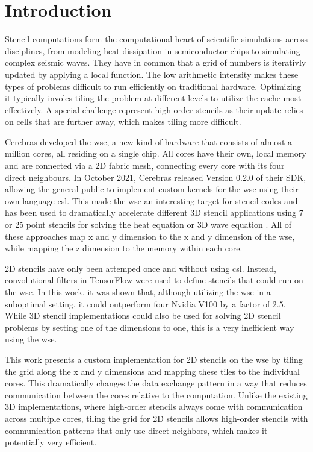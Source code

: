 \chapter{Introduction}
Stencil computations form the computational heart of scientific simulations across disciplines, from modeling heat dissipation in semiconductor chips to simulating complex seismic waves.
They have in common that a grid of numbers is iterativly updated by applying a local function.
The low arithmetic intensity makes these types of problems difficult to run efficiently on traditional hardware.
Optimizing it typically involes tiling the problem at different levels to utilize the cache most effectively.
A special challenge represent high-order stencils as their update relies on cells that are further away, which makes tiling more difficult.

Cerebras developed the \ac{wse}, a new kind of hardware that consists of almost a million cores, all residing on a single chip.
All cores have their own, local memory and are connected via a 2D fabric mesh, connecting every core with its four direct neighbours.
In October 2021, Cerebras released Version 0.2.0 of their SDK, allowing the general public to implement custom kernels for the \ac{wse} using their own language \ac{csl}. 
This made the \ac{wse} an interesting target for stencil codes and has been used to dramatically accelerate different 3D stencil applications using 7 or 25 point stencils for solving the heat equation or 3D wave equation \cite{jacquelin2022massively,rocki2020fast,woo2022disruptive}.
All of these approaches map x and y dimension to the x and y dimension of the \ac{wse}, while mapping the z dimension to the memory within each core.

2D stencils have only been attemped once and without using \ac{csl}. Instead, convolutional filters in TensorFlow were used to define stencils that could run on the \ac{wse}\cite{brown2022tensorflow}. In this work, it was shown that, although utilizing the \ac{wse} in a suboptimal setting, it could outperform four Nvidia V100 by a factor of 2.5. While 3D stencil implementations could also be used for solving 2D stencil problems by setting one of the dimensions to one, this is a very inefficient way using the \ac{wse}.

This work presents a custom implementation for 2D stencils on the \ac{wse} by tiling the grid along the x and y dimensions and mapping these tiles to the individual cores.
This dramatically changes the data exchange pattern in a way that reduces communication between the cores relative to the computation.
Unlike the existing 3D implementations, where high-order stencils always come with communication across multiple cores, tiling the grid for 2D stencils allows high-order stencils with communication patterns that only use direct neighbors, which makes it potentially very efficient.

